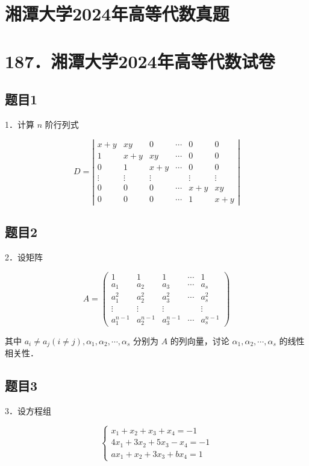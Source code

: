 \documentclass{article}
\begin{document}
\section*{湘潭大学2024年高等代数真题}
\section*{187．湘潭大学2024年高等代数试卷}

\subsection{题目1}
1．计算 \(n\) 阶行列式

\[
D=\left|\begin{array}{cccccc}
x+y & x y & 0 & \cdots & 0 & 0 \\
1 & x+y & x y & \cdots & 0 & 0 \\
0 & 1 & x+y & \cdots & 0 & 0 \\
\vdots & \vdots & \vdots & & \vdots & \vdots \\
0 & 0 & 0 & \cdots & x+y & x y \\
0 & 0 & 0 & \cdots & 1 & x+y
\end{array}\right|
\]

\subsection{题目2}
2．设矩阵

\[
A=\left(\begin{array}{ccccc}
1 & 1 & 1 & \cdots & 1 \\
a_{1} & a_{2} & a_{3} & \cdots & a_{s} \\
a_{1}^{2} & a_{2}^{2} & a_{3}^{2} & \cdots & a_{s}^{2} \\
\vdots & \vdots & \vdots & & \vdots \\
a_{1}^{n-1} & a_{2}^{n-1} & a_{3}^{n-1} & \cdots & a_{s}^{n-1}
\end{array}\right)
\]

其中 \(a_{i} \neq a_{j}(i \neq j), \alpha_{1}, \alpha_{2}, \cdots, \alpha_{s}\) 分别为 \(A\) 的列向量，讨论 \(\alpha_{1}, \alpha_{2}, \cdots, \alpha_{s}\) 的线性相关性．

\subsection{题目3}
3．设方程组

\[
\left\{\begin{array}{l}
x_{1}+x_{2}+x_{3}+x_{4}=-1 \\
4 x_{1}+3 x_{2}+5 x_{3}-x_{4}=-1 \\
a x_{1}+x_{2}+3 x_{3}+b x_{4}=1
\end{array}\right.
\]
\end{document}
